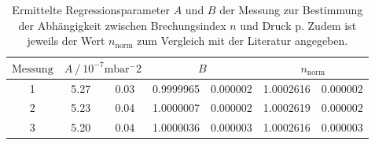 \begin{table} 
\centering 
\caption{Ermittelte Regressionsparameter $A$ und $B$ der Messung zur Bestimmung der Abhängigkeit zwischen Brechungsindex $n$ und Druck p. Zudem ist jeweils der Wert $n_{\mathup{norm}}$ zum Vergleich mit der Literatur angegeben.} 
\label{tab: fitparams_druck} 
\begin{tabular}{S S[table-format=1.2]@{${}\pm{}$} S[table-format=1.2] S[table-format=1.7]@{${}\pm{}$} S[table-format=1.7] S[table-format=1.7]@{${}\pm{}$} S[table-format=1.7] } 
\toprule  
{$\text{Messung}$} &  &  &  \\ 
 & 5.27 & 0.03 & 0.9999965 & 0.000002 & 1.0002616 & 0.000002\\ 
2 & 5.23 & 0.04 & 1.0000007 & 0.000002 & 1.0002619 & 0.000002\\ 
3 & 5.20 & 0.04 & 1.0000036 & 0.000003 & 1.0002616 & 0.000003\\ 
\bottomrule 
\end{tabular} 
\end{table}

